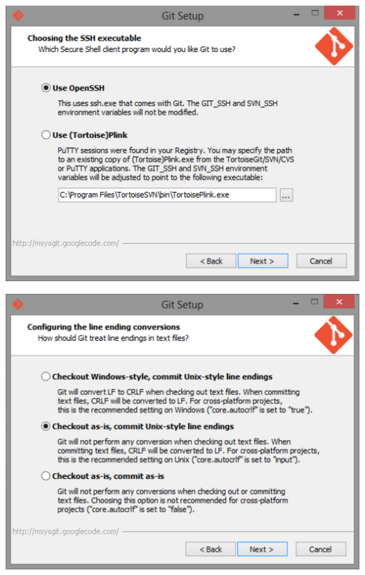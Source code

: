 \documentclass[c]{beamer}
\begin{document}
\begin{frame}
 \begin{center}
    \includegraphics[scale=0.25]{images/git-setup2.png} 
 \end{center}
\end{frame}

\begin{frame}
 \begin{center}
    \includegraphics[scale=0.25]{images/git-setup3.png} 
 \end{center}
\end{frame}

%
\end{document}
